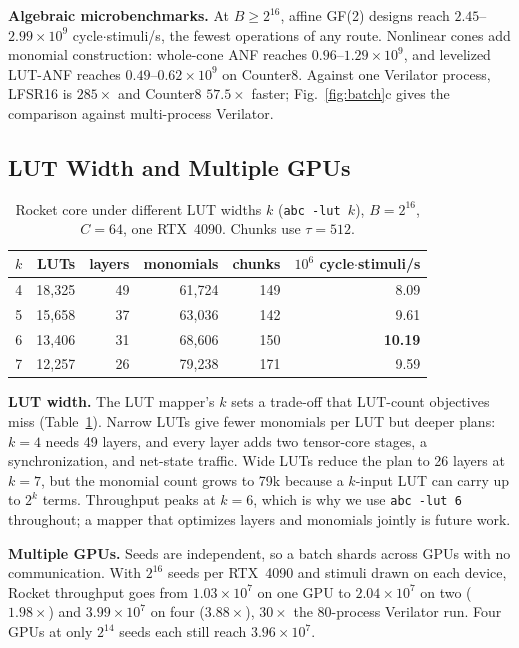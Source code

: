 \documentclass[sigconf]{acmart}
\begin{document}
\textbf{Algebraic microbenchmarks.} At $B\ge2^{16}$, affine GF(2) designs reach $2.45$--$2.99\times10^9$
cycle$\cdot$stimuli/s, the fewest operations of any route. Nonlinear cones add monomial construction:
whole-cone ANF reaches $0.96$--$1.29\times10^9$, and levelized LUT-ANF reaches
$0.49$--$0.62\times10^9$ on Counter8. Against one Verilator process, LFSR16 is $285\times$ and Counter8
$57.5\times$ faster; Fig.~\ref{fig:batch}c gives the comparison against multi-process Verilator.

\subsection{LUT Width and Multiple GPUs}
\begin{table}[tb]
\centering\footnotesize
\caption{Rocket core under different LUT widths $k$ (\texttt{abc -lut $k$}), $B=2^{16}$, $C=64$, one
RTX~4090. Chunks use $\tau=512$.}
\label{tab:lutk}
\setlength{\tabcolsep}{0pt}
\begin{tabular*}{\columnwidth}{@{\extracolsep{\fill}}crrrrr@{}}
\toprule
$k$ & LUTs & layers & monomials & chunks & $10^6$ cycle$\cdot$stimuli/s\\
\midrule
4 & 18,325 & 49 & 61,724 & 149 & 8.09\\
5 & 15,658 & 37 & 63,036 & 142 & 9.61\\
6 & 13,406 & 31 & 68,606 & 150 & \textbf{10.19}\\
7 & 12,257 & 26 & 79,238 & 171 & 9.59\\
\bottomrule
\end{tabular*}
\end{table}

\textbf{LUT width.} The LUT mapper's $k$ sets a trade-off that LUT-count objectives miss
(Table~\ref{tab:lutk}). Narrow LUTs give fewer monomials per LUT but deeper plans: $k=4$ needs 49
layers, and every layer adds two tensor-core stages, a synchronization, and net-state traffic. Wide
LUTs reduce the plan to 26 layers at $k=7$, but the monomial count grows to 79k because a $k$-input
LUT can carry up to $2^k$ terms. Throughput peaks at $k=6$, which is why we use \texttt{abc -lut 6}
throughout; a mapper that optimizes layers and monomials jointly is future work.

\textbf{Multiple GPUs.} Seeds are independent, so a batch shards across GPUs with no communication.
With $2^{16}$ seeds per RTX~4090 and stimuli drawn on each device, Rocket throughput goes from
$1.03\times10^7$ on one GPU to $2.04\times10^7$ on two ($1.98\times$) and $3.99\times10^7$ on four
($3.88\times$), $30\times$ the 80-process Verilator run. Four GPUs at only $2^{14}$ seeds each
still reach $3.96\times10^7$.
\end{document}
